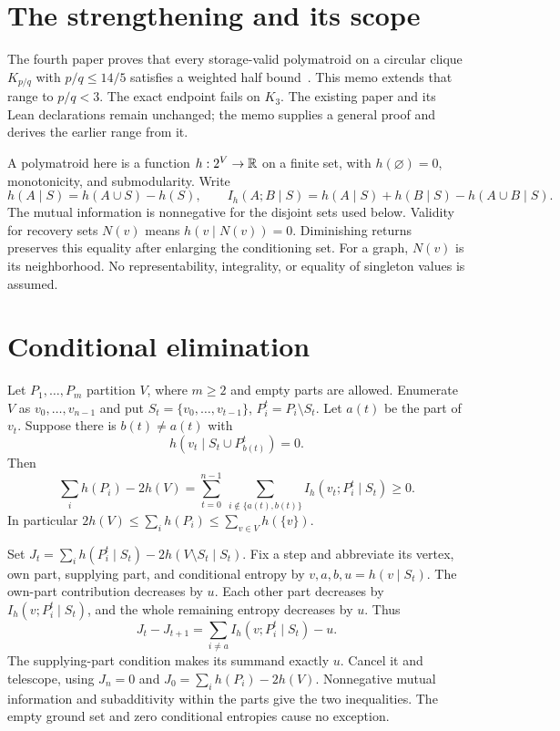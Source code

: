 \section{The strengthening and its scope}

The fourth paper proves that every storage-valid polymatroid on a
circular clique $K_{p/q}$ with $p/q\le14/5$ satisfies a weighted half
bound~\cite[Proposition ``Further good targets'']{BrendeCurved}.
This memo extends that range to $p/q<3$. The exact endpoint fails on
$K_3$. The existing paper and its Lean declarations remain unchanged;
the memo supplies a general proof and derives the earlier range from it.

A polymatroid here is a function $h:2^V\to\mathbb{R}$ on a finite set, with
$h(\varnothing)=0$, monotonicity, and submodularity. Write
\[
 h(A\mid S)=h(A\cup S)-h(S),\qquad
 I_h(A;B\mid S)=h(A\mid S)+h(B\mid S)-h(A\cup B\mid S).
\]
The mutual information is nonnegative for the disjoint sets used below.
Validity for recovery sets $N(v)$ means $h(v\mid N(v))=0$.
Diminishing returns preserves this equality after enlarging the
conditioning set. For a graph, $N(v)$ is its neighborhood.
No representability, integrality, or equality of singleton values is assumed.

\section{Conditional elimination}

\begin{theorem}\label{thm:elimination}
\notformalized
Let $P_1,\ldots,P_m$ partition $V$, where $m\ge2$ and empty parts are
allowed. Enumerate $V$ as $v_0,\ldots,v_{n-1}$ and put
$S_t=\{v_0,\ldots,v_{t-1}\}$, $P_i^t=P_i\setminus S_t$.
Let $a(t)$ be the part of $v_t$. Suppose there is $b(t)\ne a(t)$ with
\[
 h(v_t\mid S_t\cup P_{b(t)}^t)=0.
\]
Then
\begin{equation}\label{eq:elimination}
 \sum_i h(P_i)-2h(V)
 =\sum_{t=0}^{n-1}\ \sum_{i\notin\{a(t),b(t)\}}
                       I_h(v_t;P_i^t\mid S_t)\ge0.
\end{equation}
In particular $2h(V)\le\sum_i h(P_i)\le\sum_{v\in V}h(\{v\})$.
\end{theorem}
\begin{informalproof}
Set $J_t=\sum_i h(P_i^t\mid S_t)-2h(V\setminus S_t\mid S_t)$.
Fix a step and abbreviate its vertex, own part, supplying part, and
conditional entropy by $v,a,b,u=h(v\mid S_t)$.
The own-part contribution decreases by $u$. Each other part decreases
by $I_h(v;P_i^t\mid S_t)$, and the whole remaining entropy decreases
by $u$. Thus
\[
 J_t-J_{t+1}=\sum_{i\ne a}I_h(v;P_i^t\mid S_t)-u.
\]
The supplying-part condition makes its summand exactly $u$.
Cancel it and telescope, using $J_n=0$ and
$J_0=\sum_i h(P_i)-2h(V)$. Nonnegative mutual information and
subadditivity within the parts give the two inequalities.
The empty ground set and zero conditional entropies cause no exception.
\end{informalproof}

